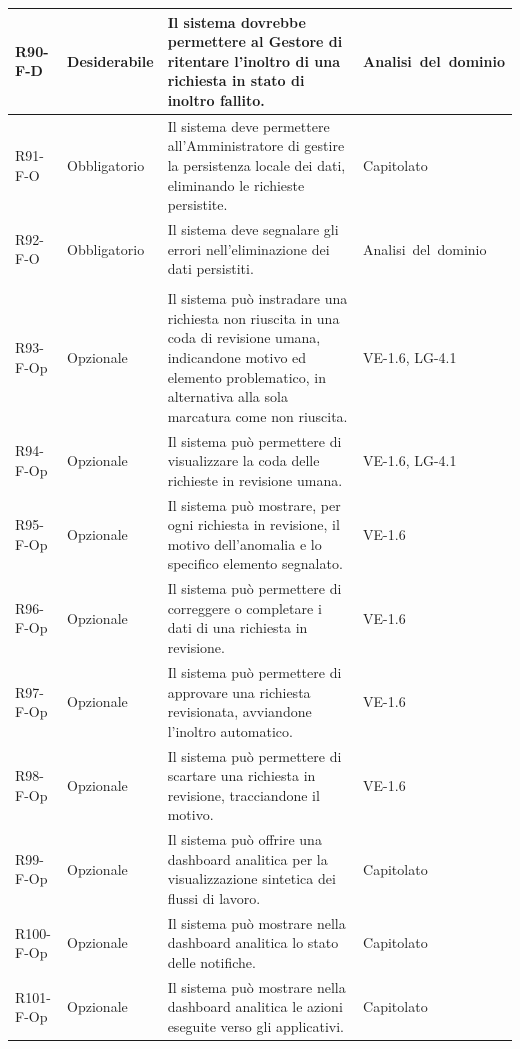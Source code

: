 {\begin{longtable}{|>{\raggedright\arraybackslash}p{1.8cm}|>{\raggedright\arraybackslash}p{2.3cm}|>{\raggedright\arraybackslash}p{6.6cm}|>{\raggedright\arraybackslash}p{3.1cm}|}
    \mbox{R90-F-D} & Desiderabile & Il sistema dovrebbe permettere al Gestore di ritentare l'inoltro di una richiesta in stato di inoltro fallito. & \mbox{Analisi del dominio} \\ \hline
    \mbox{R91-F-O} & Obbligatorio & Il sistema deve permettere all'Amministratore di gestire la persistenza locale dei dati, eliminando le richieste persistite. & \mbox{Capitolato} \\ \hline
    \mbox{R92-F-O} & Obbligatorio & Il sistema deve segnalare gli errori nell'eliminazione dei dati persistiti. & \mbox{Analisi del dominio} \\ \hline
    \multicolumn{4}{|l|}{\cellcolor[gray]{0.94}\textbf{Macroarea 7 --- Funzionalità opzionali ed estensioni}} \\ \hline
    \mbox{R93-F-Op} & Opzionale & Il sistema può instradare una richiesta non riuscita in una coda di revisione umana, indicandone motivo ed elemento problematico, in alternativa alla sola marcatura come non riuscita. & \mbox{VE-1.6}, \mbox{LG-4.1} \\ \hline
    \mbox{R94-F-Op} & Opzionale & Il sistema può permettere di visualizzare la coda delle richieste in revisione umana. & \mbox{VE-1.6}, \mbox{LG-4.1} \\ \hline
    \mbox{R95-F-Op} & Opzionale & Il sistema può mostrare, per ogni richiesta in revisione, il motivo dell'anomalia e lo specifico elemento segnalato. & \mbox{VE-1.6} \\ \hline
    \mbox{R96-F-Op} & Opzionale & Il sistema può permettere di correggere o completare i dati di una richiesta in revisione. & \mbox{VE-1.6} \\ \hline
    \mbox{R97-F-Op} & Opzionale & Il sistema può permettere di approvare una richiesta revisionata, avviandone l'inoltro automatico. & \mbox{VE-1.6} \\ \hline
    \mbox{R98-F-Op} & Opzionale & Il sistema può permettere di scartare una richiesta in revisione, tracciandone il motivo. & \mbox{VE-1.6} \\ \hline
    \mbox{R99-F-Op} & Opzionale & Il sistema può offrire una dashboard analitica per la visualizzazione sintetica dei flussi di lavoro. & \mbox{Capitolato} \\ \hline
    \mbox{R100-F-Op} & Opzionale & Il sistema può mostrare nella dashboard analitica lo stato delle notifiche. & \mbox{Capitolato} \\ \hline
    \mbox{R101-F-Op} & Opzionale & Il sistema può mostrare nella dashboard analitica le azioni eseguite verso gli applicativi. & \mbox{Capitolato} \\ \hline

\end{longtable}}

